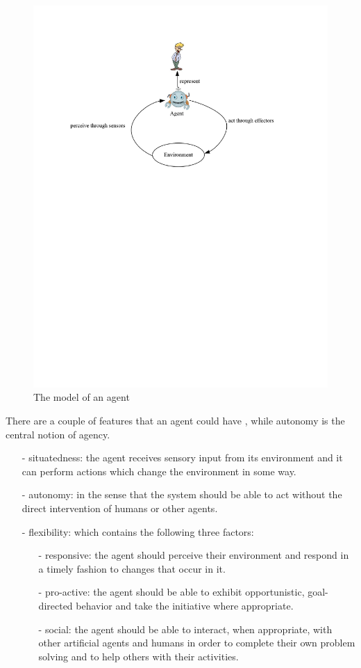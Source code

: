 \begin{figure}
\centering
\includegraphics[scale=0.8]{chap1/chap1-agent.pdf}
\caption{The model of an agent}
\label{ch1:fagent}
\end{figure}

There are a couple of features that an agent could have \cite{jennings1998}, while autonomy is the central notion of agency.
\begin{itemize}
\item[-]situatedness: the agent receives sensory input from its environment and it can perform actions which change the environment in some way.
\item[-]autonomy: in the sense that the system should be able to act without the direct intervention of humans or other agents.
\item[-]flexibility: which contains the following three factors:
\begin{itemize}
\item[-]responsive: the agent should perceive their environment and respond in a timely fashion to changes that occur in it.
\item[-]pro-active: the agent should be able to exhibit opportunistic, goal-directed behavior and take the initiative where appropriate.
\item[-]social: the agent should be able to interact, when appropriate, with other artificial agents and humans in order to complete their own problem solving and to help others with their activities.
\end{itemize}
\end{itemize} 
 

